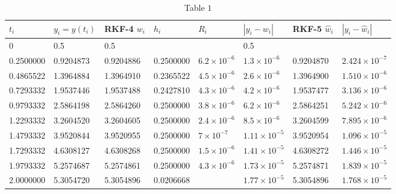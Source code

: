 \begin{table}
\scriptsize
\centering
\begin{tabular}{|l|l|l|l|l|l|l|l|}
\hline
$t_{i}$ & $y_{i}=y\left(t_{i}\right)$ & RKF-4 $w_{i}$ & $h_{i}$ & $R_{i}$ & $\left|y_{i}-w_{i}\right|$ & RKF-5 $\hat{w}_{i}$ & $\left|y_{i}-\hat{w}_{i}\right|$ \\
\hline
0 & 0.5 & 0.5 &  &  & 0.5 &  &  \\
\hline
0.2500000 & 0.9204873 & 0.9204886 & 0.2500000 & $6.2 \times 10^{-6}$ & $1.3 \times 10^{-6}$ & 0.9204870 & $2.424 \times 10^{-7}$ \\
\hline
0.4865522 & 1.3964884 & 1.3964910 & 0.2365522 & $4.5 \times 10^{-6}$ & $2.6 \times 10^{-6}$ & 1.3964900 & $1.510 \times 10^{-6}$ \\
\hline
0.7293332 & 1.9537446 & 1.9537488 & 0.2427810 & $4.3 \times 10^{-6}$ & $4.2 \times 10^{-6}$ & 1.9537477 & $3.136 \times 10^{-6}$ \\
\hline
0.9793332 & 2.5864198 & 2.5864260 & 0.2500000 & $3.8 \times 10^{-6}$ & $6.2 \times 10^{-6}$ & 2.5864251 & $5.242 \times 10^{-6}$ \\
\hline
1.2293332 & 3.2604520 & 3.2604605 & 0.2500000 & $2.4 \times 10^{-6}$ & $8.5 \times 10^{-6}$ & 3.2604599 & $7.895 \times 10^{-6}$ \\
\hline
1.4793332 & 3.9520844 & 3.9520955 & 0.2500000 & $7 \times 10^{-7}$ & $1.11 \times 10^{-5}$ & 3.9520954 & $1.096 \times 10^{-5}$ \\
\hline
1.7293332 & 4.6308127 & 4.6308268 & 0.2500000 & $1.5 \times 10^{-6}$ & $1.41 \times 10^{-5}$ & 4.6308272 & $1.446 \times 10^{-5}$ \\
\hline
1.9793332 & 5.2574687 & 5.2574861 & 0.2500000 & $4.3 \times 10^{-6}$ & $1.73 \times 10^{-5}$ & 5.2574871 & $1.839 \times 10^{-5}$ \\
\hline
2.0000000 & 5.3054720 & 5.3054896 & 0.0206668 &  & $1.77 \times 10^{-5}$ & 5.3054896 & $1.768 \times 10^{-5}$ \\
\hline
\end{tabular}
\caption{\scriptsize Table $1$}
\label{tab:rungekuttafelberg}
\end{table}
\normalsize

